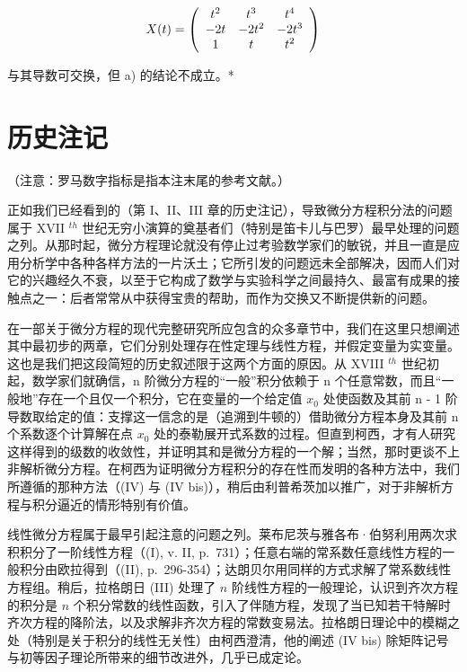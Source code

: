 \[
X (t) = \left( \begin{array}{c c c} t ^ {2} & t ^ {3} & t ^ {4} \\ - 2 t & - 2 t ^ {2} & - 2 t ^ {3} \\ 1 & t & t ^ {2} \end{array} \right)
\]

与其导数可交换，但 a) 的结论不成立。*

\section*{历史注记}
{}

（注意：罗马数字指标是指本注末尾的参考文献。）

正如我们已经看到的（第 I、II、III 章的历史注记），导致微分方程积分法的问题属于 XVII \(^{th}\) 世纪无穷小演算的奠基者们（特别是笛卡儿与巴罗）最早处理的问题之列。从那时起，微分方程理论就没有停止过考验数学家们的敏锐，并且一直是应用分析学中各种各样方法的一片沃土；它所引发的问题远未全部解决，因而人们对它的兴趣经久不衰，以至于它构成了数学与实验科学之间最持久、最富有成果的接触点之一：后者常常从中获得宝贵的帮助，而作为交换又不断提供新的问题。

在一部关于微分方程的现代完整研究所应包含的众多章节中，我们在这里只想阐述其中最初步的两章，它们分别处理存在性定理与线性方程，并假定变量为实变量。这也是我们把这段简短的历史叙述限于这两个方面的原因。从 XVIII \(^{th}\) 世纪初起，数学家们就确信，n 阶微分方程的“一般”积分依赖于 n 个任意常数，而且“一般地”存在一个且仅一个积分，它在变量的一个给定值 \(x_{0}\) 处使函数及其前 n - 1 阶导数取给定的值：支撑这一信念的是（追溯到牛顿的）借助微分方程本身及其前 n 个系数逐个计算解在点 \(x_{0}\) 处的泰勒展开式系数的过程。但直到柯西，才有人研究这样得到的级数的收敛性，并证明其和是微分方程的一个解；当然，那时更谈不上非解析微分方程。在柯西为证明微分方程积分的存在性而发明的各种方法中，我们所遵循的那种方法（(IV) 与 (IV bis)），稍后由利普希茨加以推广，对于非解析方程与积分逼近的情形特别有价值。

线性微分方程属于最早引起注意的问题之列。莱布尼茨与雅各布·伯努利用两次求积积分了一阶线性方程（(I), v. II, p.~731）；任意右端的常系数任意线性方程的一般积分由欧拉得到（(II), p.~296-354）；达朗贝尔用同样的方式求解了常系数线性方程组。稍后，拉格朗日 (III) 处理了 \(n\) 阶线性方程的一般理论，认识到齐次方程的积分是 \(n\) 个积分常数的线性函数，引入了伴随方程，发现了当已知若干特解时齐次方程的降阶法，以及求解非齐次方程的常数变易法。拉格朗日理论中的模糊之处（特别是关于积分的线性无关性）由柯西澄清，他的阐述 (IV bis) 除矩阵记号与初等因子理论所带来的细节改进外，几乎已成定论。

